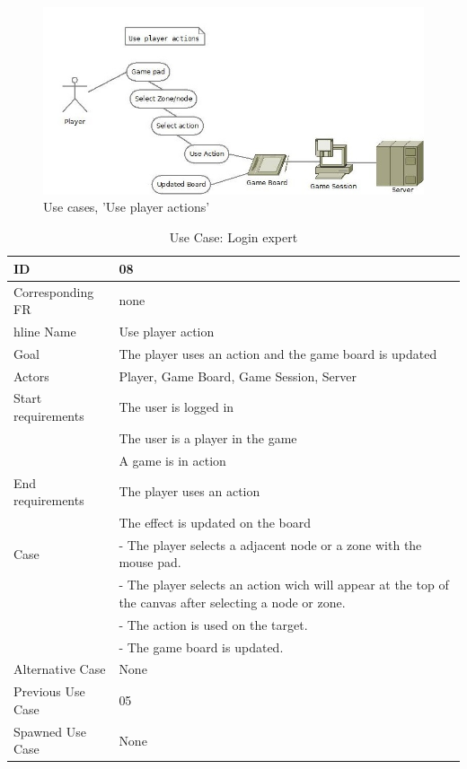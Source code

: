 \begin{figure}[H]
  \centering
    \includegraphics[width=1.0\textwidth]{img/useplayeractions.jpg}
  \caption{Use cases, 'Use player actions'} 
  \label{fig:useplayeractions}
\end{figure}


\begin{table}[H]
\begin{tabular}{|l|p{14cm}|}
\hline
	\textbf{ID} & \textbf{08}\\ \hline
	Corresponding FR & none\\hline
	Name & Use player action \\ \hline
	Goal & The player uses an action and the game board is updated\\ \hline
	Actors & Player, Game Board, Game Session, Server \\ \hline
	Start requirements & The user is logged in \\
				& The user is a player in the game\\
				& A game is in action\\ \hline
	End requirements & The player uses an action \\
				& The effect is updated on the board \\ \hline
	Case &- The player selects a adjacent node or a zone with the mouse pad.\\
		&- The player selects an action wich will appear at the top of the canvas after selecting a node or zone.\\
		&- The action is used on the target.\\
		&- The game board is updated.\\ \hline
	Alternative Case & None\\ \hline
	Previous Use Case & 05\\ \hline
	Spawned Use Case & None\\ \hline
\end{tabular}
\caption{Use Case: Login expert}
\label{fig:usecase08table}
\end{table}



